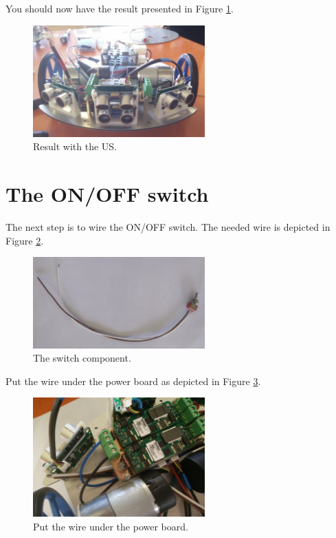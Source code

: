 \documentclass[10pt,a4paper]{report}   %
\begin{document}
 You should now have the result presented in Figure \ref{fig:41}.

\begin{figure}[H]
\center
\includegraphics[width=250px]{images/41.jpg}
\caption{Result with the US.}
\label{fig:41}
\end{figure}

\section{The ON/OFF switch}

The next step is to wire the ON/OFF switch. The needed wire is depicted in Figure \ref{fig:42}. 

\begin{figure}[H]
\center
\includegraphics[width=250px]{images/42.jpg}
\caption{The switch component.}
\label{fig:42}
\end{figure}

Put the wire under the power board as depicted in Figure \ref{fig:43}.

\begin{figure}[H]
\center
\includegraphics[width=250px]{images/43.jpg}
\caption{Put the wire under the power board.}
\label{fig:43}
\end{figure}
\end{document}
